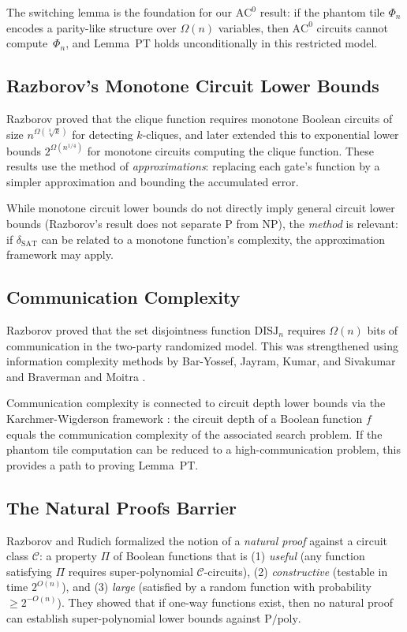 \documentclass[11pt]{article}
\theoremstyle{definition}
\theoremstyle{remark}
\newcommand{\calC}{\mathcal{C}}
\newcommand{\Ppoly}{\mathrm{P/poly}}
\newcommand{\ACz}{\mathrm{AC}^0}
\newcommand{\dSAT}{\delta_{\mathrm{SAT}}}
\begin{document}
The switching lemma is the foundation for our $\ACz$ result: if the
phantom tile $\Phi_n$ encodes a parity-like structure over $\Omega(n)$
variables, then $\ACz$ circuits cannot compute~$\Phi_n$, and
Lemma~PT holds unconditionally in this restricted model.

\subsection{Razborov's Monotone Circuit Lower Bounds}

Razborov \cite{Raz} proved that the clique function requires monotone
Boolean circuits of size $n^{\Omega(\sqrt[3]{k})}$ for detecting
$k$-cliques, and later \cite{Raz85b} extended this to exponential
lower bounds $2^{\Omega(n^{1/4})}$ for monotone circuits computing
the clique function.  These results use the method of
\emph{approximations}: replacing each gate's function by a simpler
approximation and bounding the accumulated error.

While monotone circuit lower bounds do not directly imply general circuit
lower bounds (Razborov's result does not separate P from NP), the
\emph{method} is relevant: if $\dSAT$ can be related to a monotone
function's complexity, the approximation framework may apply.

\subsection{Communication Complexity}

Razborov \cite{Raz2} proved that the set disjointness function
$\mathrm{DISJ}_n$ requires $\Omega(n)$ bits of communication in the
two-party randomized model.  This was strengthened using information
complexity methods by Bar-Yossef, Jayram, Kumar, and Sivakumar
\cite{BJKS04} and Braverman and Moitra \cite{BM13}.

Communication complexity is connected to circuit depth lower bounds
via the Karchmer-Wigderson framework \cite{KW}: the circuit depth of
a Boolean function $f$ equals the communication complexity of the
associated search problem.  If the phantom tile computation can be
reduced to a high-communication problem, this provides a path to
proving Lemma~PT.

\subsection{The Natural Proofs Barrier}

Razborov and Rudich \cite{RR} formalized the notion of a \emph{natural
proof} against a circuit class $\calC$: a property $\Pi$ of Boolean
functions that is (1) \emph{useful} (any function satisfying $\Pi$
requires super-polynomial $\calC$-circuits), (2) \emph{constructive}
(testable in time $2^{O(n)}$), and (3) \emph{large} (satisfied by a
random function with probability $\geq 2^{-O(n)}$).  They showed that
if one-way functions exist, then no natural proof can establish
super-polynomial lower bounds against $\Ppoly$.
\end{document}
